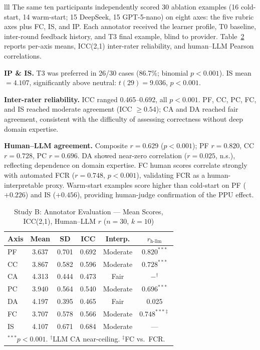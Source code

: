 \documentclass[conference]{IEEEtran}
\begin{document}
\begin{table}[htbp]
\begin{center}
\begin{tabular}{lll}
The same ten participants independently scored 30 ablation examples (16 cold-start, 14 warm-start; 15 DeepSeek, 15 GPT-5-nano) on eight axes: the five rubric axes plus FC, IS, and IP. Each annotator received the learner profile, T0 baseline, inter-round feedback history, and T3 final example, blind to provider. Table~\ref{tab:study_b} reports per-axis means, ICC(2,1) inter-rater reliability, and human--LLM Pearson correlations.

\textbf{IP \& IS.} T3 was preferred in 26/30 cases (86.7\%; binomial $p < 0.001$). IS mean $= 4.107$, significantly above neutral: $t(29) = 9.036$, $p < 0.001$.

\textbf{Inter-rater reliability.} ICC ranged 0.465--0.692, all $p < 0.001$. PF, CC, PC, FC, and IS reached moderate agreement (ICC $\geq 0.54$); CA and DA reached fair agreement, consistent with the difficulty of assessing correctness without deep domain expertise.

\textbf{Human--LLM agreement.} Composite $r = 0.629$ ($p < 0.001$); PF $r = 0.820$, CC $r = 0.728$, PC $r = 0.696$. DA showed near-zero correlation ($r = 0.025$, n.s.), reflecting dependence on domain expertise. FC human scores correlate strongly with automated FCR ($r = 0.748$, $p < 0.001$), validating FCR as a human-interpretable proxy. Warm-start examples score higher than cold-start on PF ($+0.226$) and IS ($+0.456$), providing human-judge confirmation of the PPU effect.

\begin{table}[htbp]
\caption{Study B: Annotator Evaluation — Mean Scores, ICC(2,1), Human--LLM $r$ ($n=30$, $k=10$)}
\label{tab:study_b}
\begin{center}
\scriptsize
\setlength{\tabcolsep}{4pt}
\begin{tabular}{lccccc}
\toprule
\textbf{Axis} & \textbf{Mean} & \textbf{SD} & \textbf{ICC} & \textbf{Interp.} & \textbf{$r_\text{h-llm}$} \\
\midrule
PF & 3.637 & 0.701 & 0.692 & Moderate & $0.820^{***}$ \\
CC & 3.867 & 0.582 & 0.596 & Moderate & $0.728^{***}$ \\
CA & 4.313 & 0.444 & 0.473 & Fair      & $-^\dagger$ \\
PC & 3.940 & 0.564 & 0.540 & Moderate & $0.696^{***}$ \\
DA & 4.197 & 0.395 & 0.465 & Fair      & 0.025 \\
FC & 3.707 & 0.578 & 0.566 & Moderate & $0.748^{***\ddagger}$ \\
IS & 4.107 & 0.671 & 0.684 & Moderate & --- \\
\bottomrule
\multicolumn{6}{l}{\scriptsize $^{***}p < 0.001$. $^\dagger$LLM CA near-ceiling. $^\ddagger$FC vs.\ FCR.} \\
\end{tabular}
\end{center}
\end{table}


\end{tabular}
\end{center}
\end{table}
\end{document}
